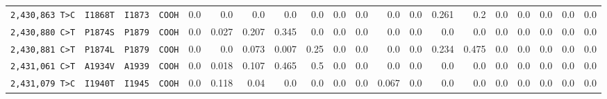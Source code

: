 \begin{tabular}{llllrrrrrrrrrrrrrrrr}
\texttt{2,430,863 T>C} & \texttt{I1868T} & \texttt{I1873} & \texttt{COOH} & 0.0 & 0.0 & 0.0 & 0.0 & 0.0 & 0.0 & 0.0 & 0.0 & 0.0 & 0.261 & 0.2 & 0.0 & 0.0 & 0.0 & 0.0 & 0.0 \\

\texttt{2,430,880 C>T} & \texttt{P1874S} & \texttt{P1879} & \texttt{COOH} & 0.0 & 0.027 & 0.207 & 0.345 & 0.0 & 0.0 & 0.0 & 0.0 & 0.0 & 0.0 & 0.0 & 0.0 & 0.0 & 0.0 & 0.0 & 0.0 \\

\texttt{2,430,881 C>T} & \texttt{P1874L} & \texttt{P1879} & \texttt{COOH} & 0.0 & 0.0 & 0.073 & 0.007 & 0.25 & 0.0 & 0.0 & 0.0 & 0.0 & 0.234 & 0.475 & 0.0 & 0.0 & 0.0 & 0.0 & 0.0 \\

\texttt{2,431,061 C>T} & \texttt{A1934V} & \texttt{A1939} & \texttt{COOH} & 0.0 & 0.018 & 0.107 & 0.465 & 0.5 & 0.0 & 0.0 & 0.0 & 0.0 & 0.0 & 0.0 & 0.0 & 0.0 & 0.0 & 0.0 & 0.0 \\

\texttt{2,431,079 T>C} & \texttt{I1940T} & \texttt{I1945} & \texttt{COOH} & 0.0 & 0.118 & 0.04 & 0.0 & 0.0 & 0.0 & 0.0 & 0.067 & 0.0 & 0.0 & 0.0 & 0.0 & 0.0 & 0.0 & 0.0 & 0.0 \\

\bottomrule
\end{tabular}
